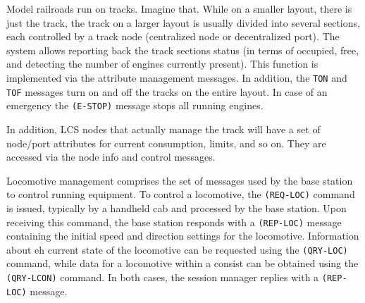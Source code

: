 
Model railroads run on tracks. Imagine that. While on a smaller layout, there is just the track, the track on a larger layout is usually divided into several sections, each controlled by a track node \textnormal{(centralized node or decentralized port)}. The system allows reporting back the track sections status \textnormal{(in terms of occupied, free, and detecting the number of engines currently present)}. This function is implemented via the attribute management messages. In addition, the \texttt{TON} and \texttt{TOF} messages turn on and off the tracks on the entire layout. In case of an emergency the \texttt{(E-STOP)} message stops all running engines. 

\begin{table}[ht!]
    \centering 
\end{table}

In addition, LCS nodes that actually manage the track will have a set of node/port attributes for current consumption, limits, and so on. They are accessed via the node info and control messages.


Locomotive management comprises the set of messages used by the base station to control running equipment. To control a locomotive, the \texttt{(REQ-LOC)} command is issued, typically by a handheld cab and processed by the base station. Upon receiving this command, the base station responds with a \texttt{(REP-LOC)} message containing the initial speed and direction settings for the locomotive. Information about eh current state of the locomotive can be requested using the \texttt{(QRY-LOC)} command, while data for a locomotive within a consist can be obtained using the \texttt{(QRY-LCON)} command. In both cases, the session manager replies with a \texttt{(REP-LOC)} message.

